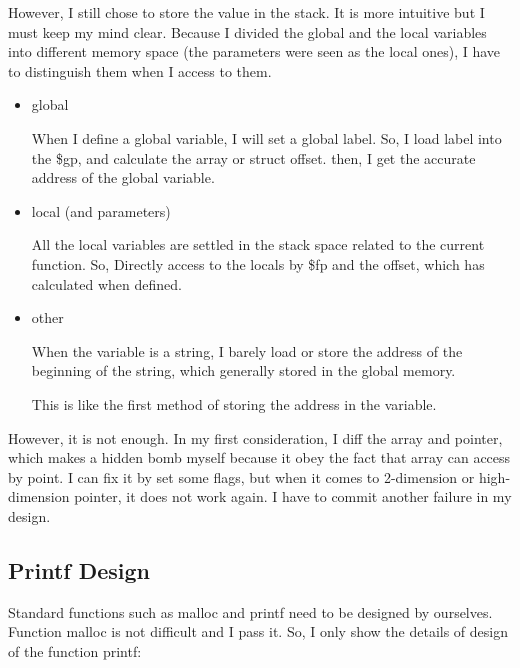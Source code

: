 \documentclass[preprint, 9pt]{sigplanconf}
\begin{document}
    However, I still chose to store the value in the stack.
    It is more intuitive but I must keep my mind clear.
    Because I divided the global and the local variables into different memory space (the parameters were seen as the local ones), I have to distinguish them when I access to them.
    \begin{itemize}
        \item{global}

            When I define a global variable, I will set a global label.
            So, I load label into the \$gp, and calculate the array or struct offset.
            then, I get the accurate address of the global variable.

        \item{local (and parameters)}

            All the local variables are settled in the stack space related to the current function.
            So, Directly access to the locals by \$fp and the offset, which has calculated when defined.

        \item{other}

            When the variable is a string, I barely load or store the address of the beginning of the string, which generally stored in the global memory.

            This is like the first method of storing the address in the variable.
    \end{itemize}

    However, it is not enough.
    In my first consideration, I diff the array and pointer, which makes a hidden bomb myself because it obey the fact that array can access by point.
    I can fix it by set some flags, but when it comes to 2-dimension or high-dimension pointer, it does not work again.
    I have to commit another failure in my design.

    \subsection{Printf Design}
    Standard functions such as malloc and printf need to be designed by ourselves.
    Function malloc is not difficult and I pass it.
    So, I only show the details of design of the function printf:
\end{document}
